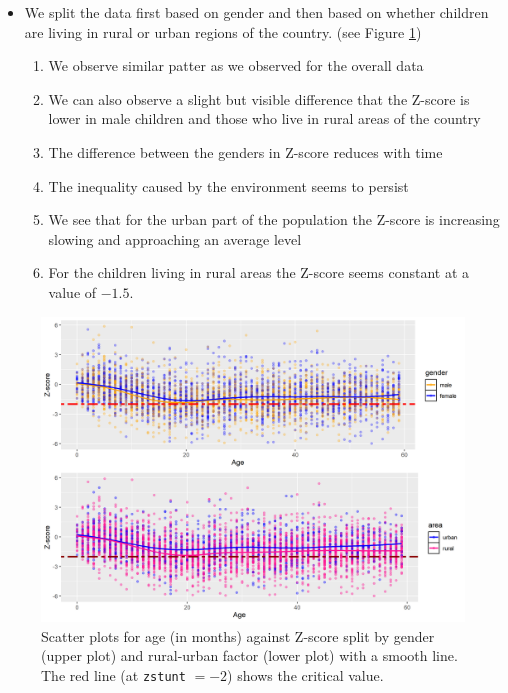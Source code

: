 \newpage
\begin{itemize}
    \item We split the data first based on gender and then based on whether children are living in rural or urban regions of the country. (see Figure \ref{fig:scatter_1})
    \begin{enumerate}
        \item We observe similar patter as we observed for the overall data
        \item We can also observe a slight but visible difference that the Z-score is lower in male children and those who live in rural areas of the country
        \item The difference between the genders in Z-score reduces with time
        \item The inequality caused by the environment seems to persist
        \item We see that for the urban part of the population the Z-score is increasing slowing and approaching an average level
        \item For the children living in rural areas the Z-score seems constant at a value of $-1.5.$
    \end{enumerate}
\end{itemize}

\begin{figure}[h]
    \centering
		\includegraphics[scale=0.5]{ex1/scatter_1.png}
		\caption{Scatter plots  for age (in months) against Z-score split by gender (upper plot) and rural-urban factor (lower plot) with a smooth line. The red line (at \texttt{zstunt} $= - 2$) shows the critical value.}
		\label{fig:scatter_1}
\end{figure}

